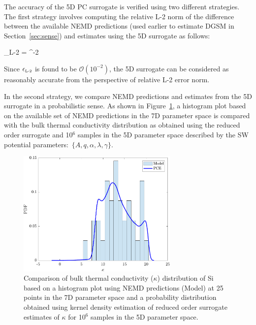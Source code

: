 The accuracy of the 5D PC surrogate is verified using two different strategies. The first strategy involves
computing the relative L-2 norm of the difference between the available NEMD predictions (used earlier
to estimate DGSM in Section~\ref{sec:sense}) and estimates using the 5D surrogate as follows:

\be
\epsilon_{\mbox{\tiny{L-2}}} = 
 ^{-2}
\ee
 
\noindent Since $\epsilon_{\mbox{\tiny{L-2}}}$ is found to be $\mathcal{O}(10^{-2})$, the 5D surrogate can be considered as
reasonably accurate from the perspective of relative L-2 error norm. 

In the second strategy, we compare NEMD
predictions and estimates from the 5D surrogate in a probabilistic sense. As shown in Figure~\ref{fig:verify}, a 
histogram plot based on the available set of NEMD predictions in the 7D parameter space is compared with
the bulk thermal conductivity distribution as obtained using the reduced order surrogate and 10$^6$ samples in the
5D parameter space described by the SW potential parameters:~$\{A,q,\alpha,\lambda,\gamma\}$. 

\begin{figure}[htbp]
 \begin{center}
  \includegraphics[width=0.70\textwidth]{./Figures/PCE5D_kde}
\caption{Comparison of bulk thermal conductivity ($\kappa$) distribution of Si based on a histogram plot
using NEMD predictions (Model) at 25 points in the 7D parameter space and a probability distribution obtained 
using kernel density estimation of  reduced order surrogate estimates of $\kappa$ for 10$^6$ samples in the 5D
parameter space.}
\label{fig:verify}
\end{center}
\end{figure}

